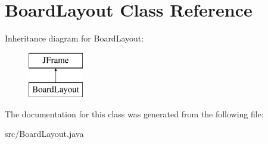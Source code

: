 \hypertarget{class_board_layout}{}\section{Board\+Layout Class Reference}
\label{class_board_layout}
Inheritance diagram for Board\+Layout\+:\begin{figure}[H]
\begin{center}
\leavevmode
\includegraphics[height=2.000000cm]{class_board_layout}
\end{center}
\end{figure}


The documentation for this class was generated from the following file\+:\begin{DoxyCompactItemize}
\item 
src/Board\+Layout.\+java\end{DoxyCompactItemize}
